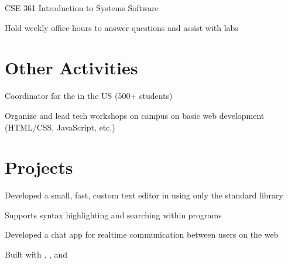 \documentclass[]{deedy-resume-openfont}
\begin{document}
\begin{minipage}[t]{0.66\textwidth}
\begin{tightemize}
\item CSE 361 Introduction to Systems Software
\item Hold weekly office hours to answer questions and assist with labs
\end{tightemize}
\sectionsep


\section{Other Activities}

\begin{tightemize}
\item Coordinator for the  in the US (500+ students)
\item Organize and lead tech workshops on campus on basic web development (HTML/CSS, JavaScript, etc.)
\end{tightemize}
\sectionsep


\section{Projects}
\descript{}
\begin{tightemize}
\item Developed a small, fast, custom text editor in  using only the standard library
\item Supports syntax highlighting and searching within programs
\end{tightemize}
\sectionsep

\descript{}
\begin{tightemize}
\item Developed a chat app for realtime communication between users on the web
\item Built with , , and 
\end{tightemize}
\sectionsep


\end{minipage}
\end{document}
